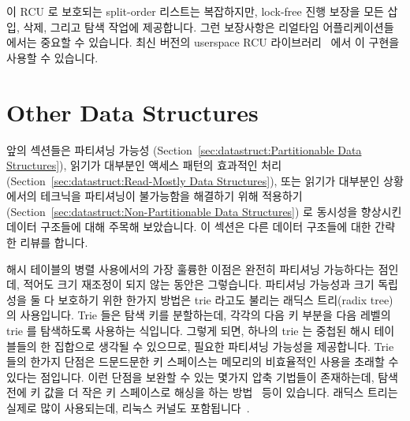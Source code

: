 이 RCU 로 보호되는 split-order 리스트는 복잡하지만, lock-free 진행 보장을 모든
삽입, 삭제, 그리고 탐색 작업에 제공합니다.
그런 보장사항은 리얼타임 어플리케이션들에서는 중요할 수 있습니다.
최신 버전의 userspace RCU 라이브러리~\cite{MathieuDesnoyers2009URCU} 에서 이
구현을 사용할 수 있습니다.

\section{Other Data Structures}
\label{sec:datastruct:Other Data Structures}

앞의 섹션들은 파티셔닝 가능성
(Section~\ref{sec:datastruct:Partitionable Data Structures}),
읽기가 대부분인 액세스 패턴의 효과적인 처리
(Section~\ref{sec:datastruct:Read-Mostly Data Structures}),
또는 읽기가 대부분인 상황에서의 테크닉을 파티셔닝이 불가능함을 해결하기 위해 적용하기
(Section~\ref{sec:datastruct:Non-Partitionable Data Structures})
로 동시성을 향상시킨 데이터 구조들에 대해 주목해 보았습니다.
이 섹션은 다른 데이터 구조들에 대한 간략한 리뷰를 합니다.

해시 테이블의 병렬 사용에서의 가장 훌륭한 이점은 완전히 파티셔닝 가능하다는
점인데, 적어도 크기 재조정이 되지 않는 동안은 그렇습니다.
파티셔닝 가능성과 크기 독립성을 둘 다 보호하기 위한 한가지 방법은 trie 라고도
불리는 래딕스 트리(radix tree) 의 사용입니다.
Trie 들은 탐색 키를 분할하는데, 각각의 다음 키 부분을 다음 레벨의 trie 를
탐색하도록 사용하는 식입니다.
그렇게 되면, 하나의 trie 는 중첩된 해시 테이블들의 한 집합으로 생각될 수
있으므로, 필요한 파티셔닝 가능성을 제공합니다.
Trie 들의 한가지 단점은 드문드문한 키 스페이스는 메모리의 비효율적인 사용을
초래할 수 있다는 점입니다.
이런 단점을 보완할 수 있는 몇가지 압축 기법들이 존재하는데, 탐색 전에 키 값을
더 작은 키 스페이스로 해싱을 하는 방법~\cite{RobertOlsson2006a} 등이 있습니다.
래딕스 트리는 실제로 많이 사용되는데, 리눅스 커널도
포함됩니다~\cite{NickPiggin2006radixtree}.
\iffalse

